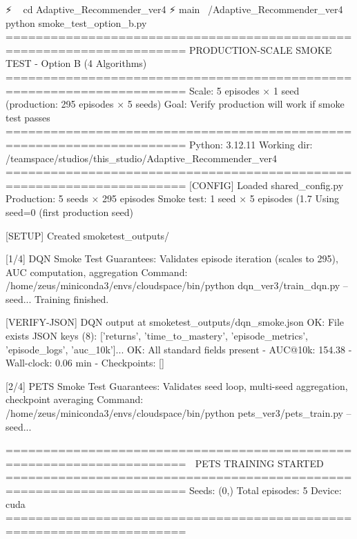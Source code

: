 ⚡ ~ cd Adaptive_Recommender_ver4 
⚡ main ~/Adaptive_Recommender_ver4 python smoke_test_option_b.py
======================================================================
PRODUCTION-SCALE SMOKE TEST - Option B (4 Algorithms)
======================================================================
Scale: 5 episodes × 1 seed (production: 295 episodes × 5 seeds)
Goal: Verify production will work if smoke test passes
======================================================================
Python: 3.12.11
Working dir: /teamspace/studios/this_studio/Adaptive_Recommender_ver4
======================================================================
[CONFIG] Loaded shared_config.py
   Production: 5 seeds × 295 episodes
   Smoke test: 1 seed × 5 episodes (1.7%
   Using seed=0 (first production seed)

[SETUP] Created smoketest_outputs/


[1/4] DQN Smoke Test
   Guarantees: Validates episode iteration (scales to 295), AUC computation, aggregation
   Command: /home/zeus/miniconda3/envs/cloudspace/bin/python dqn_ver3/train_dqn.py --seed...
Training finished.

[VERIFY-JSON] DQN output at smoketest_outputs/dqn_smoke.json
   OK: File exists
   JSON keys (8): ['returns', 'time_to_mastery', 'episode_metrics', 'episode_logs', 'auc_10k']...
   OK: All standard fields present
   - AUC@10k: 154.38
   - Wall-clock: 0.06 min
   - Checkpoints: []

[2/4] PETS Smoke Test
   Guarantees: Validates seed loop, multi-seed aggregation, checkpoint averaging
   Command: /home/zeus/miniconda3/envs/cloudspace/bin/python pets_ver3/pets_train.py --seed...

======================================================================
🚀 PETS TRAINING STARTED
======================================================================
Seeds: (0,)
Total episodes: 5
Device: cuda
======================================================================


